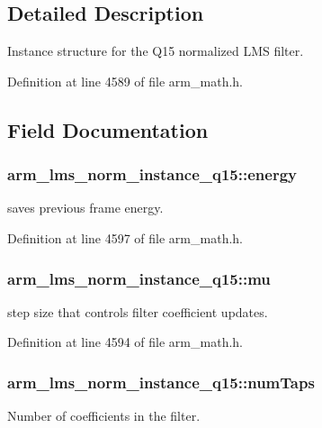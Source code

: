 \subsection{Detailed Description}
Instance structure for the Q15 normalized L\-M\-S filter. 

Definition at line 4589 of file arm\-\_\-math.\-h.



\subsection{Field Documentation}
\hypertarget{structarm__lms__norm__instance__q15_a1c81ded399919d8181026bc1c8602e7b}{
\subsubsection[{energy}]{ arm\-\_\-lms\-\_\-norm\-\_\-instance\-\_\-q15\-::energy}}\label{structarm__lms__norm__instance__q15_a1c81ded399919d8181026bc1c8602e7b}
saves previous frame energy. 

Definition at line 4597 of file arm\-\_\-math.\-h.

\hypertarget{structarm__lms__norm__instance__q15_a7ce00f21d11cfda6d963240641deea8c}{
\subsubsection[{mu}]{ arm\-\_\-lms\-\_\-norm\-\_\-instance\-\_\-q15\-::mu}}\label{structarm__lms__norm__instance__q15_a7ce00f21d11cfda6d963240641deea8c}
step size that controls filter coefficient updates. 

Definition at line 4594 of file arm\-\_\-math.\-h.

\hypertarget{structarm__lms__norm__instance__q15_a9ee7a45f4f315d7996a969e25fdc7146}{
\subsubsection[{num\-Taps}]{ arm\-\_\-lms\-\_\-norm\-\_\-instance\-\_\-q15\-::num\-Taps}}\label{structarm__lms__norm__instance__q15_a9ee7a45f4f315d7996a969e25fdc7146}
Number of coefficients in the filter. 

